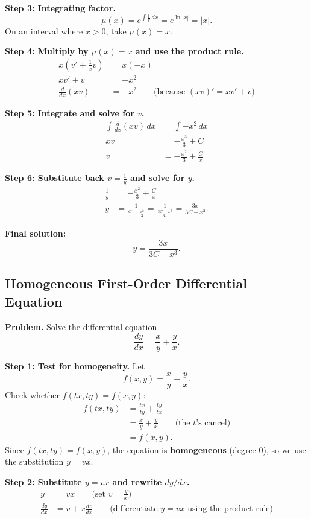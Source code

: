 \documentclass[11pt]{article}
\begin{document}
\noindent\textbf{Step 3: Integrating factor.}
\[
\mu(x)=e^{\int \frac{1}{x}\,dx}=e^{\ln|x|}=|x|.
\]
On an interval where $x>0$, take $\mu(x)=x$.

\noindent\textbf{Step 4: Multiply by $\mu(x)=x$ and use the product rule.}
\begin{align*}
x\left(v'+\frac{1}{x}v\right) &= x(-x) \\
xv' + v &= -x^{2} \\
\frac{d}{dx}(xv) &= -x^{2} \qquad\text{(because $(xv)'=xv' + v$)}
\end{align*}

\noindent\textbf{Step 5: Integrate and solve for $v$.}
\begin{align*}
\int \frac{d}{dx}(xv)\,dx &= \int -x^{2}\,dx \\
xv &= -\frac{x^{3}}{3}+C \\
v &= -\frac{x^{2}}{3}+\frac{C}{x}
\end{align*}

\noindent\textbf{Step 6: Substitute back $v=\frac{1}{y}$ and solve for $y$.}
\begin{align*}
\frac{1}{y} &= -\frac{x^{2}}{3}+\frac{C}{x} \\
y &= \frac{1}{\frac{C}{x}-\frac{x^{2}}{3}}
= \frac{1}{\frac{3C-x^{3}}{3x}}
= \frac{3x}{3C-x^{3}}.
\end{align*}

\noindent\textbf{Final solution:}
\[
\boxed{\;y = \frac{3x}{3C-x^{3}}.\;}
\]

\subsection{Homogeneous First-Order Differential Equation}

\noindent\textbf{Problem.} Solve the differential equation
\[
\frac{dy}{dx}=\frac{x}{y}+\frac{y}{x}.
\]

\noindent\textbf{Step 1: Test for homogeneity.}
Let
\[
f(x,y)=\frac{x}{y}+\frac{y}{x}.
\]
Check whether $f(tx,ty)=f(x,y)$:
\begin{align*}
f(tx,ty)
&= \frac{tx}{ty}+\frac{ty}{tx} \\
&= \frac{x}{y}+\frac{y}{x} \qquad\text{(the $t$'s cancel)}\\
&= f(x,y).
\end{align*}
\noindent Since $f(tx,ty)=f(x,y)$, the equation is \textbf{homogeneous} (degree $0$), so we use the substitution $y=vx$.

\medskip
\noindent\textbf{Step 2: Substitute $y=vx$ and rewrite $dy/dx$.}
\begin{align*}
y &= vx \qquad\text{(set $v=\frac{y}{x}$)}\\
\frac{dy}{dx} &= v + x\frac{dv}{dx} \qquad\text{(differentiate $y=vx$ using the product rule)}
\end{align*}
\end{document}
